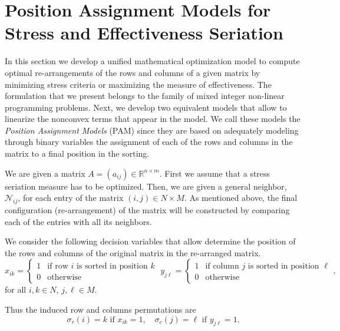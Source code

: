 \documentclass[a4paper,11pt, reqno]{amsart}
\def\N{\mathcal{N}}
\def\R{\mathbb{R}}
\begin{document}
\section{Position Assignment Models for Stress and Effectiveness Seriation}  \label{sec:2}

In this section we develop a unified mathematical optimization model to compute optimal re-arrangements of the rows and columns of a given matrix by minimizing  stress criteria or maximizing the measure of effectiveness. The formulation that we present belongs to the family of mixed integer non-linear programming problems. Next, we develop two equivalent models that allow to linearize the nonconvex terms that appear in the model. We call these models the \emph{Position Assignment Models} (PAM) since they are based on adequately modeling through binary variables the assignment of each of the rows and columns in the matrix to a final position in the sorting.

We are given a matrix $A =(a_{ij}) \in \R^{n\times m}$. First we assume that a stress seriation measure has to be optimized. Then, we are given a general neighbor, $\N_{ij}$, for each entry of the matrix $(i,j) \in N \times M$. As mentioned above, the final configuration (re-arrangement) of the matrix will be constructed by comparing each of the entries with all its neighbors.  

We consider the following decision variables that allow determine the position of the rows and columns of the original matrix in the re-arranged matrix. 
$$
x_{ik} = \begin{cases}
    1 & \mbox{if row $i$ is sorted in position $k$}\\
    0 & \mbox{otherwise}
\end{cases} \; y_{j\ell} = \begin{cases}
    1 & \mbox{if column $j$ is sorted in position $\ell$}\\
    0 & \mbox{otherwise}
\end{cases},
$$
for all $i,k\in N$, $j,\ell \in M$.

Thus the induced row and columns permutations are
$$
\sigma_{r}(i) = k \text{ if $x_{ik}=1$}, \quad 
\sigma_{c}(j) = \ell  \text{ if $y_{j\ell }=1$}.
$$
\end{document}
